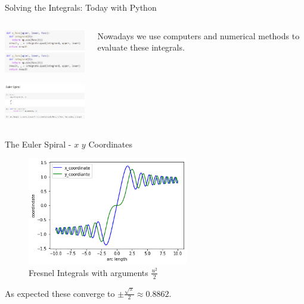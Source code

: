 \documentclass{beamer}
\begin{document}
\begin{frame}{Solving the Integrals: Today with Python}
	\begin{columns}
		\begin{column}{0.5\textwidth}
			\includegraphics[width=50mm, scale=0.5]{code_1.png}
			
			\includegraphics[width=50mm, scale=0.5]{code_2.png}
		\end{column}
		\begin{column}{0.5\textwidth}
		Nowadays we use computers and numerical methods to evaluate these integrals.
			
		\end{column}
	\end{columns}
\end{frame}

\begin{frame}{The Euler Spiral - $x$ $y$ Coordinates}
	\begin{figure}
		\caption{Fresnel Integrals with arguments $\frac{u^2}{2}$}
		\centering
		\includegraphics[width=70mm, scale=0.5]{euler_x_vs_y.png}
	\end{figure}
	As expected these converge to $\pm \frac{\sqrt{\pi}}{2} \approx 0.8862$.
\end{frame}
\end{document}
